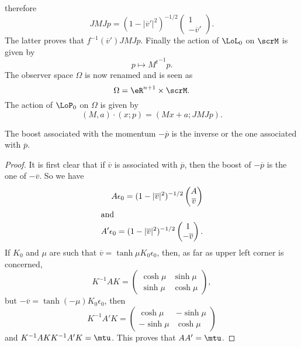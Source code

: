 therefore
\begin{equation}
	JMJp=(1-|\overline{v}'|^2)^{-1/2}
	\begin{pmatrix}
		1 \\-\overline{v}'
	\end{pmatrix}.
\end{equation}
The latter proves that $f^{-1}(\overline{v}')JMJp$. Finally the action of $\LoL_0$ on $\scrM$ is given by
\[
	p\mapsto {M^{t}}^{-1} p.
\]
The observer space $\Omega$ is now renamed  and is seen as
\begin{equation}
	\Omega=\eR^{n+1}\times\scrM.
\end{equation}
The action of $\LoP_0$ on $\Omega$ is given by
\begin{equation} \label{eq_Maxp}
	(M,a)\cdot(x;p)=(Mx+a;JMJp).
\end{equation}


\begin{lemma} \label{lem_boost_inverse}
	The boost associated with the momentum $-\overline{p}$ is the inverse or the one associated with $\overline{p}$.
\end{lemma}


\begin{proof}
	It is first clear that if $\overline{v}$ is associated with $\overline{p}$, then the boost of $-\overline{p}$ is the one of $-\overline{v}$. So we have
	\begin{subequations}
		\begin{align}
			A\epsilon_0=(1-|\overline{v}|^2)^{-1/2}
			\begin{pmatrix}
				A \\\overline{v}
			\end{pmatrix} \\
			\intertext{and}
			A'\epsilon_0=(1-|\overline{v}|^2)^{-1/2}
			\begin{pmatrix}
				1 \\-\overline{v}
			\end{pmatrix}.
		\end{align}
	\end{subequations}
	If $K_0$ and $\mu$ are such that $\overline{v}=\tanh\mu K_0\epsilon_0$, then, as far as upper left corner is concerned,
	\[
		K^{-1}AK=
		\begin{pmatrix}
			\cosh\mu & \sinh\mu \\
			\sinh\mu & \cosh\mu
		\end{pmatrix},
	\]
	but $-\overline{v}=\tanh(-\mu)K_0\epsilon_0$, then
	\[
		K^{-1}A'K=
		\begin{pmatrix}
			\cosh\mu  & -\sinh \mu \\
			-\sinh\mu & \cosh\mu
		\end{pmatrix}
	\]
	and $K^{-1}AKK^{-1}A'K=\mtu$. This proves that $AA'=\mtu$.
\end{proof}


